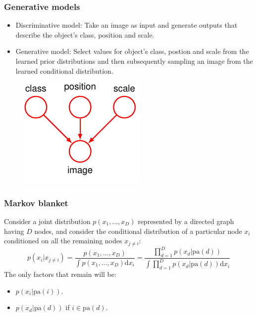 \documentclass{beamer}
\begin{document}
\begin{frame}
    \frametitle{Generative models}
    \begin{itemize}
        \item Discriminative model: Take an image as input and generate outputs that describe the object's class, position and scale.
        \item Generative model: Select values for object's class, postion and scale from the learned prior distributions and then subsequently sampling an image from the learned conditional distribution.
    \end{itemize}
    \begin{figure}
        \includegraphics{Figure_24.pdf}
    \end{figure}
\end{frame}

\begin{frame}
    \frametitle{Markov blanket}
    Consider a joint distribution $p(x_{1},\hdots,x_{D})$ represented by a directed graph having $D$ nodes, and consider the conditional distribution of a particular node $x_{i}$ conditioned on all the remaining nodes $x_{j\ne{}i}$:
    \begin{equation*}
        p(x_{i}|x_{j\ne{}i})=\frac{p(x_{1},\hdots,x_{D})}{\int{}p(x_{1},\hdots,x_{D})\mathrm{d}x_{i}}=\frac{\prod_{d=1}^{D}p(x_{d}|\mathrm{pa}(d))}{\int\prod_{d=1}^{D}p(x_{d}|\mathrm{pa}(d))\mathrm{d}x_{i}}
    \end{equation*}
    The only factors that remain will be:
    \begin{itemize}
        \item $p(x_{i}|\mathrm{pa}(i))$.
        \item $p(x_{d}|\mathrm{pa}(d))$ if $i\in\mathrm{pa}(d)$.
    \end{itemize}
\end{frame}
\end{document}
